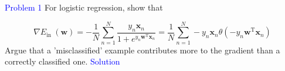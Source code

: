 \textcolor{blue}{Problem 1}
For logistic regression, show that

\begin{equation}
    \nabla E_{\text {in }}(\mathbf{w})  =-\frac{1}{N} \sum_{n=1}^{N} \frac{y_{n} \mathbf{x}_{n}}{1+e^{y_{n} \mathbf{w}^{\mathrm{T}} \mathbf{x}_{n}}}  
 =\frac{1}{N} \sum_{n=1}^{N}-y_{n} \mathbf{x}_{n} \theta\left(-y_{n} \mathbf{w}^{\mathrm{T}} \mathbf{x}_{n}\right)
\end{equation}
Argue that a 'misclassified' example contributes more to the gradient than a correctly classified one.
\textcolor{blue}{Solution}















\newpage